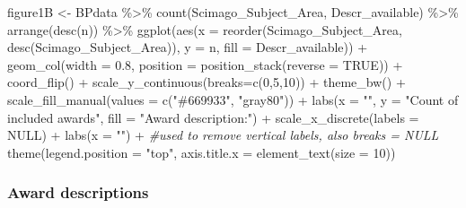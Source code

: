 \documentclass[
]{article}
\newenvironment{Shaded}{\begin{snugshade}}{\end{snugshade}}
\newcommand{\AttributeTok}[1]{\textcolor[rgb]{0.77,0.63,0.00}{#1}}
\newcommand{\CommentTok}[1]{\textcolor[rgb]{0.56,0.35,0.01}{\textit{#1}}}
\newcommand{\ConstantTok}[1]{\textcolor[rgb]{0.00,0.00,0.00}{#1}}
\newcommand{\DecValTok}[1]{\textcolor[rgb]{0.00,0.00,0.81}{#1}}
\newcommand{\FloatTok}[1]{\textcolor[rgb]{0.00,0.00,0.81}{#1}}
\newcommand{\FunctionTok}[1]{\textcolor[rgb]{0.00,0.00,0.00}{#1}}
\newcommand{\NormalTok}[1]{#1}
\newcommand{\OtherTok}[1]{\textcolor[rgb]{0.56,0.35,0.01}{#1}}
\newcommand{\SpecialCharTok}[1]{\textcolor[rgb]{0.00,0.00,0.00}{#1}}
\newcommand{\StringTok}[1]{\textcolor[rgb]{0.31,0.60,0.02}{#1}}
\begin{document}
\begin{Shaded}
\begin{Highlighting}[]
\NormalTok{figure1B }\OtherTok{\textless{}{-}}\NormalTok{ BPdata }\SpecialCharTok{\%\textgreater{}\%}
    \FunctionTok{count}\NormalTok{(Scimago\_Subject\_Area, Descr\_available) }\SpecialCharTok{\%\textgreater{}\%}
    \FunctionTok{arrange}\NormalTok{(}\FunctionTok{desc}\NormalTok{(n)) }\SpecialCharTok{\%\textgreater{}\%}
    \FunctionTok{ggplot}\NormalTok{(}\FunctionTok{aes}\NormalTok{(}\AttributeTok{x =} \FunctionTok{reorder}\NormalTok{(Scimago\_Subject\_Area, }\FunctionTok{desc}\NormalTok{(Scimago\_Subject\_Area)), }\AttributeTok{y =}\NormalTok{ n, }\AttributeTok{fill =}\NormalTok{ Descr\_available)) }\SpecialCharTok{+} 
    \FunctionTok{geom\_col}\NormalTok{(}\AttributeTok{width =} \FloatTok{0.8}\NormalTok{, }\AttributeTok{position =} \FunctionTok{position\_stack}\NormalTok{(}\AttributeTok{reverse =} \ConstantTok{TRUE}\NormalTok{)) }\SpecialCharTok{+}
    \FunctionTok{coord\_flip}\NormalTok{() }\SpecialCharTok{+}
    \FunctionTok{scale\_y\_continuous}\NormalTok{(}\AttributeTok{breaks=}\FunctionTok{c}\NormalTok{(}\DecValTok{0}\NormalTok{,}\DecValTok{5}\NormalTok{,}\DecValTok{10}\NormalTok{)) }\SpecialCharTok{+}
    \FunctionTok{theme\_bw}\NormalTok{() }\SpecialCharTok{+} 
    \FunctionTok{scale\_fill\_manual}\NormalTok{(}\AttributeTok{values =} \FunctionTok{c}\NormalTok{(}\StringTok{"\#669933"}\NormalTok{, }\StringTok{"gray80"}\NormalTok{)) }\SpecialCharTok{+}
    \FunctionTok{labs}\NormalTok{(}\AttributeTok{x =} \StringTok{""}\NormalTok{, }\AttributeTok{y =} \StringTok{"Count of included awards"}\NormalTok{, }\AttributeTok{fill =} \StringTok{"Award description:"}\NormalTok{) }\SpecialCharTok{+} 
    \FunctionTok{scale\_x\_discrete}\NormalTok{(}\AttributeTok{labels =} \ConstantTok{NULL}\NormalTok{) }\SpecialCharTok{+} \FunctionTok{labs}\NormalTok{(}\AttributeTok{x =} \StringTok{""}\NormalTok{)  }\SpecialCharTok{+} \CommentTok{\#used to remove vertical labels, also breaks = NULL}
    \FunctionTok{theme}\NormalTok{(}\AttributeTok{legend.position =} \StringTok{"top"}\NormalTok{, }\AttributeTok{axis.title.x =} \FunctionTok{element\_text}\NormalTok{(}\AttributeTok{size =} \DecValTok{10}\NormalTok{))}
\end{Highlighting}
\end{Shaded}

\hypertarget{award-descriptions}{%
\subsubsection{Award descriptions}\label{award-descriptions}}
\end{document}
